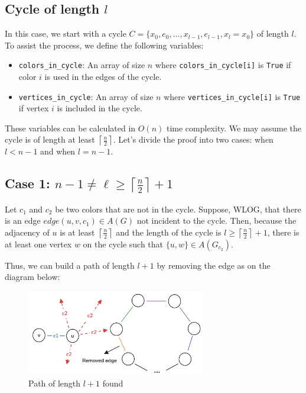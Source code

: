 \subsection{Cycle of length \( l \)}

In this case, we start with a cycle \( C = \{x_0, e_0, \dots, x_{l-1}, e_{l-1}, x_{l} = x_0\} \) of length \( l \).
To assist the process, we define the following variables:

\begin{itemize}
    \item \texttt{colors\_in\_cycle}: An array of size \( n \) where \texttt{colors\_in\_cycle[i]} is \texttt{True} if color \( i \) is used in the edges of the cycle.
    \item \texttt{vertices\_in\_cycle}: An array of size \( n \) where \texttt{vertices\_in\_cycle[i]} is \texttt{True} if vertex \( i \) is included in the cycle.
\end{itemize}

These variables can be calculated in \( O(n) \) time complexity. We may assume the cycle is of length at least \( \left \lceil \frac{n}{2} \right \rceil \).
Let's divide the proof into two cases: when \( l < n - 1 \) and when \( l = n - 1 \).

\subsection{Case 1: \( n - 1 \neq \ell \geq \left \lceil \frac{n}{2} \right \rceil + 1 \)}

Let $c_1$ and $c_2$ be two colors that are not in the cycle. Suppose, WLOG, that 
there is an edge $edge(u, v, c_1) \in A(G)$ not incident to the cycle. Then, because
the adjacency of $u$ is at least $\left \lceil \frac{n}{2} \right \rceil$ and the 
length of the cycle is $l \geq \left \lceil \frac{n}{2} \right \rceil + 1$, there is at least
one vertex $w$ on the cycle such that $\{u, w\} \in A(G_{c_2})$.

Thus, we can build a path of length $l + 1$ by removing the edge as on the diagram below:

\begin{figure}[H]
    \centering
    \includegraphics[width=0.7\textwidth]{figuras/cycle_path_extension.png}
    \caption{Path of length \( l + 1 \) found}
    \label{fig:cycle_path_extension}
\end{figure}

